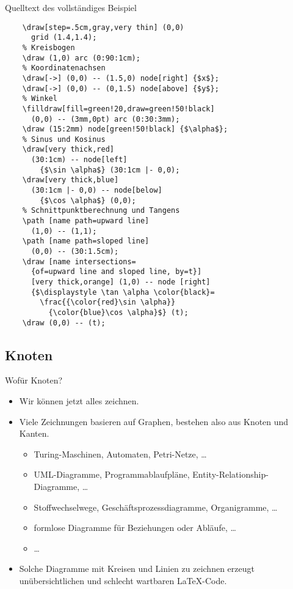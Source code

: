 \begin{Frame}{Quelltext des vollständiges Beispiel}
  \begin{lstlisting}[gobble=4]
    % Gitter im Hintergrund
    \draw[step=.5cm,gray,very thin] (0,0)
      grid (1.4,1.4);
    % Kreisbogen
    \draw (1,0) arc (0:90:1cm);
    % Koordinatenachsen
    \draw[->] (0,0) -- (1.5,0) node[right] {$x$};
    \draw[->] (0,0) -- (0,1.5) node[above] {$y$};
    % Winkel
    \filldraw[fill=green!20,draw=green!50!black]
      (0,0) -- (3mm,0pt) arc (0:30:3mm);
    \draw (15:2mm) node[green!50!black] {$\alpha$};
    % Sinus und Kosinus
    \draw[very thick,red]
      (30:1cm) -- node[left]
        {$\sin \alpha$} (30:1cm |- 0,0);
    \draw[very thick,blue]
      (30:1cm |- 0,0) -- node[below]
        {$\cos \alpha$} (0,0);
    % Schnittpunktberechnung und Tangens
    \path [name path=upward line]
      (1,0) -- (1,1);
    \path [name path=sloped line]
      (0,0) -- (30:1.5cm);
    \draw [name intersections=
      {of=upward line and sloped line, by=t}]
      [very thick,orange] (1,0) -- node [right]
      {$\displaystyle \tan \alpha \color{black}=
        \frac{{\color{red}\sin \alpha}}
          {\color{blue}\cos \alpha}$} (t);
    \draw (0,0) -- (t);
  \end{lstlisting}
\end{Frame}

\jonny


\subsection{Knoten}

\begin{Frame}{Wofür Knoten?}
  \begin{itemize}
    \item \alert{Wir können jetzt alles zeichnen.}
    \item Viele Zeichnungen basieren auf Graphen,
      bestehen also aus Knoten und Kanten.
      \begin{itemize}
        \item Turing-Maschinen, Automaten, Petri-Netze, \dots
        \item UML-Diagramme, Programmablaufpläne, Entity-Relationship-Diagramme, \dots
        \item Stoffwechselwege, Geschäftsprozessdiagramme, Organigramme, \dots
        \item formlose Diagramme für Beziehungen oder Abläufe, \dots
        \item \dots
      \end{itemize}
    \item Solche Diagramme mit Kreisen und Linien zu zeichnen erzeugt
      \alert{unübersichtlichen und schlecht wartbaren} \LaTeX-Code.
  \end{itemize}
\end{Frame}

